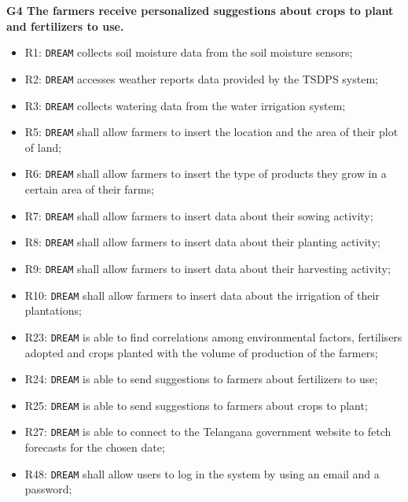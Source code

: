 \documentclass{article}
\begin{document}
\vspace{5mm}
\textbf{G4 The farmers receive personalized suggestions about crops to plant and fertilizers to use.}
\begin{itemize}
    \item R1: \verb|DREAM| collects soil moisture data from the soil moisture sensors;
    \item R2: \verb|DREAM| accesses weather reports data provided by the TSDPS system;

    \item R3: \verb|DREAM| collects watering data from the water irrigation system;

    \item R5: \verb|DREAM| shall allow farmers to insert the location and the area of their plot of land;

    \item R6: \verb|DREAM| shall allow farmers to insert the type of products they grow in a certain area of their farms;

    \item R7: \verb|DREAM| shall allow farmers to insert data about their sowing activity;

    \item R8: \verb|DREAM| shall allow farmers to insert data about their planting activity;
    
    \item R9: \verb|DREAM| shall allow farmers to insert data about their harvesting activity;
    
    \item R10: \verb|DREAM| shall allow farmers to insert data about the irrigation of their plantations;
    
    \item R23: \verb|DREAM| is able to find correlations among environmental factors, fertilisers adopted and crops planted with the volume of production of the farmers;
 
    \item R24: \verb|DREAM| is able to send suggestions to farmers about fertilizers to use;
    
    \item R25: \verb|DREAM| is able to send suggestions to farmers about crops to plant; 
 
    \item R27: \verb|DREAM| is able to connect to the Telangana government website to fetch forecasts for the chosen date;
    
    \item R48: \verb|DREAM| shall allow users to log in the system by using an email and a password;
    

\end{itemize}
\end{document}

